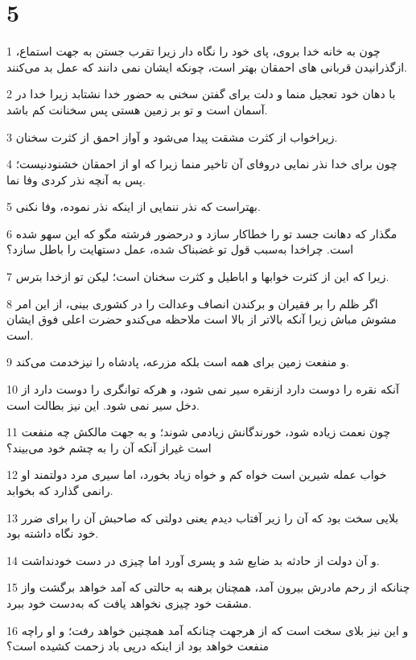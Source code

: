 \chapter{5}

\par 1 چون به خانه خدا بروی، پای خود را نگاه دار زیرا تقرب جستن به جهت استماع، ازگذرانیدن قربانی های احمقان بهتر است، چونکه ایشان نمی دانند که عمل بد می‌کنند.
\par 2 با دهان خود تعجیل منما و دلت برای گفتن سخنی به حضور خدا نشتابد زیرا خدا در آسمان است و تو بر زمین هستی پس سخنانت کم باشد. 
\par 3 زیراخواب از کثرت مشقت پیدا می‌شود و آواز احمق از کثرت سخنان.
\par 4 چون برای خدا نذر نمایی دروفای آن تاخیر منما زیرا که او از احمقان خشنودنیست؛ پس به آنچه نذر کردی وفا نما.
\par 5 بهتراست که نذر ننمایی از اینکه نذر نموده، وفا نکنی.
\par 6 مگذار که دهانت جسد تو را خطاکار سازد و درحضور فرشته مگو که این سهو شده است. چراخدا به‌سبب قول تو غضبناک شده، عمل دستهایت را باطل سازد؟
\par 7 زیرا که این از کثرت خوابها و اباطیل و کثرت سخنان است؛ لیکن تو ازخدا بترس.
\par 8 اگر ظلم را بر فقیران و برکندن انصاف وعدالت را در کشوری بینی، از این امر مشوش مباش زیرا آنکه بالاتر از بالا است ملاحظه می‌کندو حضرت اعلی فوق ایشان است.
\par 9 و منفعت زمین برای همه است بلکه مزرعه، پادشاه را نیزخدمت می‌کند.
\par 10 آنکه نقره را دوست دارد ازنقره سیر نمی شود، و هر‌که توانگری را دوست دارد از دخل سیر نمی شود. این نیز بطالت است.
\par 11 چون نعمت زیاده شود، خورندگانش زیادمی شوند؛ و به جهت مالکش چه منفعت است غیراز آنکه آن را به چشم خود می‌بیند؟
\par 12 خواب عمله شیرین است خواه کم و خواه زیاد بخورد، اما سیری مرد دولتمند او رانمی گذارد که بخوابد.
\par 13 بلایی سخت بود که آن را زیر آفتاب دیدم یعنی دولتی که صاحبش آن را برای ضرر خود نگاه داشته بود.
\par 14 و آن دولت از حادثه بد ضایع شد و پسری آورد اما چیزی در دست خودنداشت.
\par 15 چنانکه از رحم مادرش بیرون آمد، همچنان برهنه به حالتی که آمد خواهد برگشت واز مشقت خود چیزی نخواهد یافت که به‌دست خود ببرد.
\par 16 و این نیز بلای سخت است که از هرجهت چنانکه آمد همچنین خواهد رفت؛ و او راچه منفعت خواهد بود از اینکه در‌پی باد زحمت کشیده است؟
